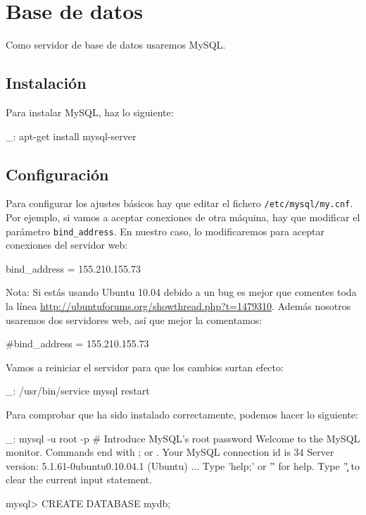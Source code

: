 \chapter{Base de datos}
\label{web:basedatos}

Como servidor de base de datos usaremos MySQL.


\section{Instalación}

Para instalar MySQL, haz lo siguiente:

\begin{bashcode}
_: apt-get install mysql-server
\end{bashcode}


\section{Configuración}

Para configurar los ajustes básicos hay que editar el fichero \texttt{/etc/mysql/my.cnf}. Por ejemplo, si vamos a aceptar conexiones de otra máquina, hay que modificar el parámetro \texttt{bind\_address}. En nuestro caso, lo modificaremos para aceptar conexiones del servidor web:

\begin{bashcode}
bind_address = 155.210.155.73
\end{bashcode}

Nota: Si estás usando Ubuntu 10.04 debido a un bug es mejor que comentes toda la línea  \url{http://ubuntuforums.org/showthread.php?t=1479310}. Además nosotros usaremos dos servidores web, así que mejor la comentamos:

\begin{bashcode}
#bind_address = 155.210.155.73
\end{bashcode}

Vamos a reiniciar el servidor para que los cambios surtan efecto:

\begin{bashcode}
_: /usr/bin/service mysql restart
\end{bashcode}

Para comprobar que ha sido instalado correctamente, podemos hacer lo siguiente:

\begin{bashcode}
_: mysql -u root -p     # Introduce MySQL's root password
Welcome to the MySQL monitor.  Commands end with ; or \g.
Your MySQL connection id is 34
Server version: 5.1.61-0ubuntu0.10.04.1 (Ubuntu)
...
Type 'help;' or '\h' for help. Type '\c' to clear the current input statement.

mysql> CREATE DATABASE mydb;
\end{bashcode}


